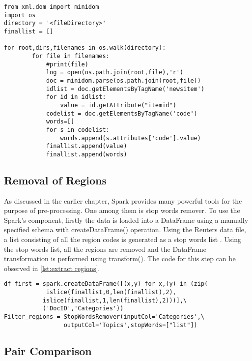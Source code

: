 \begin{lstlisting}[style=Java,float=htb,caption={Python Code to parse XML file to extract category using minidom library in non-parallel Environment},label={lst:minidom}]
from xml.dom import minidom
import os
directory = '<fileDirectory>'
finallist = []

for root,dirs,filenames in os.walk(directory):
        for file in filenames:
            #print(file)
            log = open(os.path.join(root,file),'r')
            doc = minidom.parse(os.path.join(root,file))
            idlist = doc.getElementsByTagName('newsitem')
            for id in idlist:
                value = id.getAttribute("itemid")
            codelist = doc.getElementsByTagName('code')
            words=[]
            for s in codelist:
                words.append(s.attributes['code'].value)
            finallist.append(value)
            finallist.append(words)

\end{lstlisting}

\newpage
\subsection{Removal of Regions}
\par As discussed in the earlier chapter, Spark provides many powerful tools for the purpose of pre-processing. One among them is stop words remover. To use the Spark's component, firstly the data is loaded into a DataFrame using a manually specified schema with createDataFrame() operation. Using the Reuters data file, a list consisting of all the region codes is generated as a stop words list . Using the stop words list, all the regions are removed and the DataFrame transformation is performed using transform(). The code for this step can be observed in \ref{lst:extract regions}.

\begin{lstlisting}[style=Java,float=htb,caption={Python Code for loading lists into DataFrame and filter regions},label={lst:extract regions}]
df_first = spark.createDataFrame([(x,y) for x,(y) in (zip(
            islice(finallist,0,len(finallist),2),
           islice(finallist,1,len(finallist),2)))],\
           ('DocID','Categories'))
Filter_regions = StopWordsRemover(inputCol='Categories',\
				 outputCol='Topics',stopWords=["list"])
\end{lstlisting}



\subsection{Pair Comparison} 

